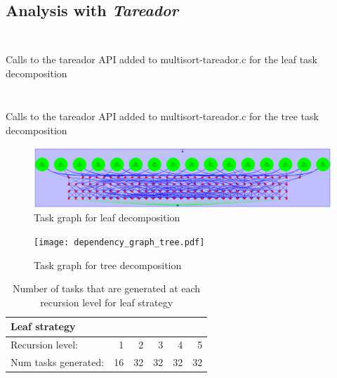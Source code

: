\subsection{Analysis with \emph{Tareador}}

\begin{listing}[H]
\inputminted[firstline=20,lastline=31]{c}{sources/multisort-tareador-leaf.c}
\inputminted[firstline=33,lastline=51]{c}{sources/multisort-tareador-leaf.c}
\caption{Calls to the tareador API added to multisort-tareador.c for the leaf task decomposition}
\label{listing:tareador_leaf}
\end{listing}

\begin{listing}[H]
\inputminted[firstline=20,lastline=31]{c}{sources/multisort-tareador-tree.c}
\inputminted[firstline=33,lastline=51]{c}{sources/multisort-tareador-tree.c}
\caption{Calls to the tareador API added to multisort-tareador.c for the tree task decomposition}
\label{listing:tareador_leaf}
\end{listing}

\begin{figure}[H]
\centering
\includegraphics[width=\textwidth]{dependency_graph_leaf.pdf}
\caption{Task graph for leaf decomposition}
\label{fig:tar_tasks_leaf}
\end{figure}

\begin{figure}[H]
\centering
\texttt{[image: dependency\_graph\_tree.pdf]}
\caption{Task graph for tree decomposition}
\label{fig:tar_tasks_tree}
\end{figure}

\begin{table}[H]
\centering
\begin{tabular}{lrrrrr}
\toprule
Leaf strategy & & & & & \\
\midrule
Recursion level:        & 1     & 2     & 3     & 4     & 5  \\
Num tasks generated:    & 16    & 32    & 32    & 32    & 32 \\
\bottomrule
\end{tabular}

\caption{Number of tasks that are generated at each recursion level for leaf strategy} 
\label{tab:Execution_time}
\end{table}

